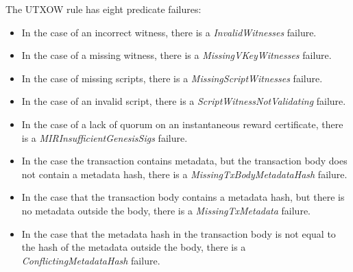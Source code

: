 The UTXOW rule has eight predicate failures:
\begin{itemize}
\item In the case of an incorrect witness,
  there is a \emph{InvalidWitnesses} failure.
\item In the case of a missing witness,
  there is a \emph{MissingVKeyWitnesses} failure.
\item In the case of missing scripts,
  there is a \emph{MissingScriptWitnesses} failure.
\item In the case of an invalid script,
  there is a \emph{ScriptWitnessNotValidating} failure.
\item In the case of a lack of quorum on an instantaneous reward certificate,
  there is a \emph{MIRInsufficientGenesisSigs} failure.
\item In the case the transaction contains metadata,
  but the transaction body does not contain a metadata hash,
  there is a \emph{MissingTxBodyMetadataHash} failure.
\item In the case that the transaction body contains a metadata hash,
  but there is no metadata outside the body,
  there is a \emph{MissingTxMetadata} failure.
\item In the case that the metadata hash in the transaction body
  is not equal to the hash of the metadata outside the body,
  there is a \emph{ConflictingMetadataHash} failure.
\end{itemize}

\clearpage
